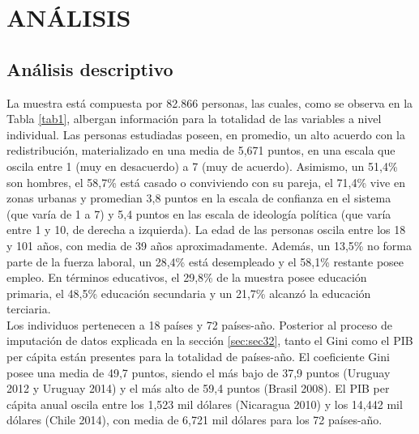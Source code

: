 \documentclass[12pt,letterpaper]{article}
\begin{document}
\newpage

\section{ANÁLISIS \label{sec:sec4}}

\subsection{Análisis descriptivo \label{sec:sec41}}

La muestra está compuesta por 82.866 personas, las cuales, como se observa en la Tabla \ref{tab1}, albergan información para la totalidad de las variables a nivel individual. Las personas estudiadas poseen, en promedio, un alto acuerdo con la redistribución, materializado en una media de 5,671 puntos, en una escala que oscila entre 1 (muy en desacuerdo) a 7 (muy de acuerdo). Asimismo, un 51,4\% son hombres, el 58,7\% está casado o conviviendo con su pareja, el 71,4\% vive en zonas urbanas y promedian 3,8 puntos en la escala de confianza en el sistema (que varía de 1 a 7) y 5,4 puntos en las escala de ideología política (que varía entre 1 y 10, de derecha a izquierda). La edad de las personas oscila entre los 18 y 101 años, con media de 39 años aproximadamente. Además, un 13,5\% no forma parte de la fuerza laboral, un 28,4\% está desempleado y el 58,1\% restante posee empleo. En términos educativos, el 29,8\% de la muestra posee educación primaria, el 48,5\% educación secundaria y un 21,7\% alcanzó la educación terciaria.\\

Los individuos pertenecen a 18 países y 72 países-año. Posterior al proceso de imputación de datos explicada en la sección \ref{sec:sec32}, tanto el Gini como el PIB per cápita están presentes para la totalidad de países-año. El coeficiente Gini posee una media de 49,7 puntos, siendo el más bajo de 37,9 puntos (Uruguay 2012 y Uruguay 2014) y el más alto de 59,4 puntos (Brasil 2008). El PIB per cápita anual oscila entre los 1,523 mil dólares (Nicaragua 2010) y los 14,442 mil dólares (Chile 2014), con media de 6,721 mil dólares para los 72 países-año.\\
\end{document}
